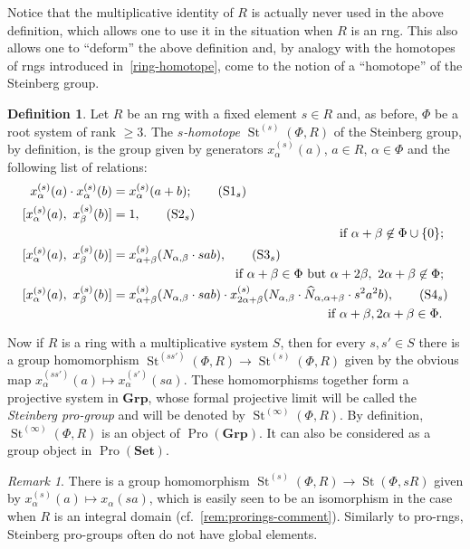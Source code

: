 \documentclass{article}
\theoremstyle{definition}
\newtheorem{df}[lemma]{Definition} \Crefname{df}{Definition}{Definitions}
\theoremstyle{remark}
\newtheorem{rem}[lemma]{Remark}
\DeclareMathOperator\St{St}
\DeclareMathOperator{\Pro}{Pro}
\newcommand{\Set}{\mathbf{Set}}
\newcommand{\Group}{\mathbf{Grp}}
\begin{document}
Notice that the multiplicative identity of $R$ is actually never used in the above definition, 
 which allows one to use it in the situation when $R$ is an rng.
This also allows one to ``deform'' the above definition and, by analogy with the homotopes of rngs introduced in~\cref{ring-homotope}, come to the notion of a ``homotope'' of the Steinberg group.
\begin{df}\label{def:Steinberg-homotope}
 Let $R$ be an rng with a fixed element $s \in R$ and, as before, $\Phi$ be a root system of rank $\geq 3$.
 The {\it $s$-homotope $\St^{(s)}(\Phi, R)$} of the Steinberg group, by definition, is the group given by generators $x_\alpha^{(s)}(a)$, $a\in R$, $\alpha\in\Phi$ and the following list of relations: \begin{align}
 x^{(s)}_\alpha(a) \cdot x^{(s)}_\alpha(b)    &= x^{(s)}_\alpha(a+b); \tag{S$1_s$} \label{S1} \\
 [x^{(s)}_\alpha(a),\ x^{(s)}_\beta(b)] &= 1, \tag{S$2_s$} \label{S2} \\ 
 \multispan2{\hfil if $\alpha + \beta \not\in\Phi \cup \{0\};$} \nonumber \\
 [x^{(s)}_\alpha(a),\ x^{(s)}_\beta(b)] &= x^{(s)}_{\alpha + \beta}(N_{\alpha,\beta} \cdot sab), \tag{S$3_s$} \label{S3} \\
 \multispan2{\hfill if $\alpha+\beta\in\Phi$ but $\alpha+2\beta,\ 2\alpha+\beta\not\in\Phi;$} \nonumber \\
 [x^{(s)}_\alpha(a),\ x^{(s)}_\beta(b)] &= x^{(s)}_{\alpha + \beta}(N_{\alpha,\beta} \cdot sab) \cdot x^{(s)}_{2\alpha+\beta}(N_{\alpha,\beta} \cdot \widehat{N}_{\alpha, \alpha+\beta}\cdot s^2a^2b), \tag{S$4_s$} \label{S4} \\ \multispan2{ \hfill if $\alpha+\beta,2\alpha+\beta\in\Phi$.} \nonumber  \end{align} 
 
 Now if $R$ is a ring with a multiplicative system $S$, then for every $s, s' \in S$ there is a group homomorphism $\St^{(ss')}(\Phi, R) \to \St^{(s)}(\Phi, R)$ given by the obvious map $x_\alpha^{(ss')}(a) \mapsto x_\alpha^{(s')}(sa)$.
 These homomorphisms together form a projective system in $\Group$, whose formal projective limit will be called the {\it Steinberg pro-group} and will be denoted by $\St^{(\infty)}(\Phi, R)$.
 By definition, $\St^{(\infty)}(\Phi, R)$ is an object of $\Pro(\Group)$. It can also be considered as a group object in $\Pro(\Set)$. 
\end{df}

\begin{rem} \label{rem:pro-Steinberg-comment}
There is a group homomorphism $\St^{(s)}(\Phi, R) \to \St(\Phi, sR)$ given by $x_\alpha^{(s)}(a)\mapsto x_\alpha(sa)$, which is easily seen to be an isomorphism in the case when $R$ is an integral domain (cf.~\cref{rem:prorings-comment}). Similarly to pro-rngs, Steinberg pro-groups often do not have global elements.
\end{rem}
 
\end{document}
